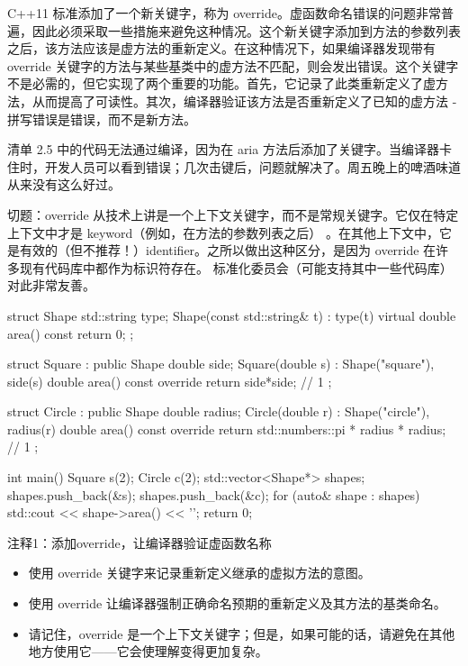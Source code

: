 
C++11 标准添加了一个新关键字，称为 override。虚函数命名错误的问题非常普遍，因此必须采取一些措施来避免这种情况。这个新关键字添加到方法的参数列表之后，该方法应该是虚方法的重新定义。在这种情况下，如果编译器发现带有 override 关键字的方法与某些基类中的虚方法不匹配，则会发出错误。这个关键字不是必需的，但它实现了两个重要的功能。首先，它记录了此类重新定义了虚方法，从而提高了可读性。其次，编译器验证该方法是否重新定义了已知的虚方法 - 拼写错误是错误，而不是新方法。

清单 2.5 中的代码无法通过编译，因为在 aria 方法后添加了关键字。当编译器卡住时，开发人员可以看到错误；几次击键后，问题就解决了。周五晚上的啤酒味道从来没有这么好过。

切题：override 从技术上讲是一个上下文关键字，而不是常规关键字。它仅在特定上下文中才是 keyword（例如，在方法的参数列表之后） 。在其他上下文中，它是有效的（但不推荐！）identifier。之所以做出这种区分，是因为 override 在许多现有代码库中都作为标识符存在。
标准化委员会（可能支持其中一些代码库）对此非常友善。


\begin{cpp}
struct Shape {
  std::string type;
  Shape(const std::string& t) : type(t) {}
  virtual double area() const { return 0; }
};

struct Square : public Shape {
  double side;
  Square(double s) : Shape("square"), side(s) {}
  double area() const override { return side*side; } // 1
};

struct Circle : public Shape {
  double radius;
  Circle(double r) : Shape("circle"), radius(r) {}
  double area() const override { return
    std::numbers::pi * radius * radius; } // 1
};

int main() {
  Square s(2);
  Circle c(2);
  std::vector<Shape*> shapes;
  shapes.push_back(&s);
  shapes.push_back(&c);
  for (auto& shape : shapes)
    std::cout << shape->area() << '\n';
  return 0;
}
\end{cpp}

{\footnotesize
注释1：添加override，让编译器验证虚函数名称
}


\begin{itemize}
\item
使用 override 关键字来记录重新定义继承的虚拟方法的意图。

\item
使用 override 让编译器强制正确命名预期的重新定义及其方法的基类命名。

\item
请记住，override 是一个上下文关键字；但是，如果可能的话，请避免在其他地方使用它——它会使理解变得更加复杂。
\end{itemize}





















